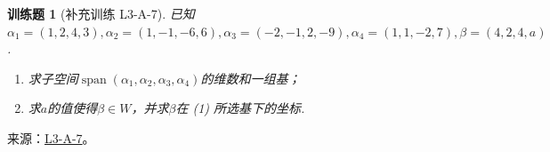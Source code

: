 \documentclass[12pt,fontset=fandol]{ctexart}
\newtheorem{exercise}{训练题}[section]
\begin{document}
\begin{exercise}[补充训练 L3-A-7]\label{prob:L3-A-7}
已知$\alpha_1=(1,2,4,3),\alpha_2=(1,-1,-6,6),\alpha_3=(-2,-1,2,-9),\alpha_4=(1,1,-2,7),\beta=(4,2,4,a)$.
        \begin{enumerate}
            \item 求子空间$\operatorname{span}(\alpha_1,\alpha_2,\alpha_3,\alpha_4)$的维数和一组基；

            \item 求$a$的值使得$\beta\in W$，并求$\beta$在 (1) 所选基下的坐标.
        \end{enumerate}
\end{exercise}
\noindent 来源：\href{https://github.com/yhwu-is/Linear-Algebra-Left-Undone/blob/new/%E8%AE%B2%E4%B9%89/%E4%B8%93%E9%A2%98/3%20%E6%9C%89%E9%99%90%E7%BB%B4%E7%BA%BF%E6%80%A7%E7%A9%BA%E9%97%B4.tex}{L3-A-7}。
\end{document}
